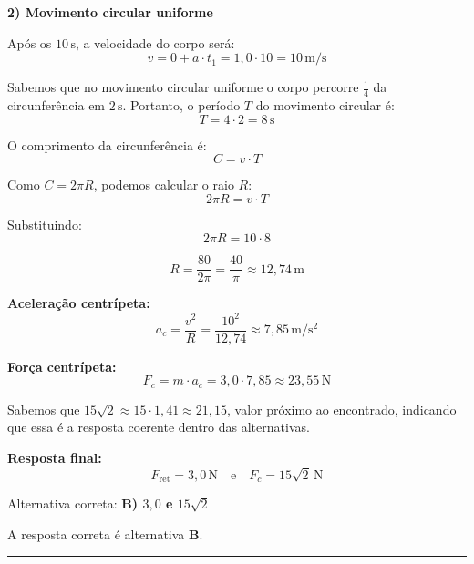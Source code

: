 \documentclass[a4paper,12pt]{article}
\begin{document}
\begin{flushleft}
\vspace{0.3cm}
\textbf{2) Movimento circular uniforme}

Após os $10\,\mathrm{s}$, a velocidade do corpo será:
\[
v = 0 + a \cdot t_1 = 1{,}0 \cdot 10 = 10\,\mathrm{m/s}
\]

Sabemos que no movimento circular uniforme o corpo percorre $\frac{1}{4}$ da circunferência em $2\,\mathrm{s}$. Portanto, o período $T$ do movimento circular é:
\[
T = 4 \cdot 2 = 8\,\mathrm{s}
\]

O comprimento da circunferência é:
\[
C = v \cdot T
\]

Como $C = 2\pi R$, podemos calcular o raio $R$:
\[
2\pi R = v \cdot T
\]

Substituindo:
\[
2\pi R = 10 \cdot 8
\]

\[
R = \frac{80}{2\pi} = \frac{40}{\pi} \approx 12{,}74\,\mathrm{m}
\]

\vspace{0.3cm}
\textbf{Aceleração centrípeta:}
\[
a_c = \frac{v^2}{R} = \frac{10^2}{12{,}74} \approx 7{,}85\,\mathrm{m/s^2}
\]

\textbf{Força centrípeta:}
\[
F_c = m \cdot a_c = 3{,}0 \cdot 7{,}85 \approx 23{,}55\,\mathrm{N}
\]

Sabemos que $15\sqrt{2} \approx 15 \cdot 1{,}41 \approx 21{,}15$, valor próximo ao encontrado, indicando que essa é a resposta coerente dentro das alternativas.

\vspace{0.3cm}
\textbf{Resposta final:}
\[
\boxed{F_{\text{ret}} = 3{,}0\,\mathrm{N} \quad\text{e}\quad F_c = 15\sqrt{2}\,\mathrm{N}}
\]

Alternativa correta: \textbf{B) $3{,}0$ e $15\sqrt{2}$}

A resposta correta é alternativa \colorbox{green!50}{\textbf{B}}.

\end{flushleft}

\noindent\rule{\linewidth}{0.6pt}\\
\end{document}
